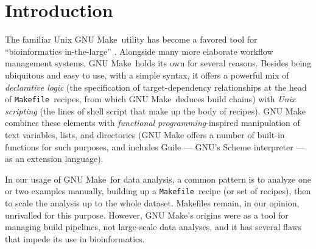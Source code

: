 \newcommand\Makefile{{\tt Makefile}}
\newcommand\make{GNU Make}
\newcommand\biomake{BioMake}
\newcommand\footurl[1]{\footnote{\url{#1}, accessed Dec 9, 2016.}}


\section*{Introduction}

The familiar Unix \make\ utility has become a favored tool for ``bioinformatics in-the-large'' \citep{ParkerGorlickLee2003}.
Alongside many more elaborate workflow management systems, \make\ holds its own for several reasons.
Besides being ubiquitous and easy to use, with a simple syntax, it offers a powerful mix
of {\em declarative logic} (the specification of target-dependency relationships at the head of \Makefile\ recipes, from which \make\ deduces build chains)
with {\em Unix scripting} (the lines of shell script that make up the body of recipes).
GNU Make combines these elements with {\em functional programming}-inspired manipulation of text variables, lists, and directories
(GNU Make offers a number of built-in functions for such purposes, and includes Guile --- GNU's Scheme interpreter --- as an extension language).

In our usage of \make\ for data analysis, a common pattern is to analyze one or two examples manually, building up a \Makefile\ recipe (or set of recipes),
then to scale the analysis up to the whole dataset.
Makefiles remain, in our opinion, unrivalled for this purpose.
However, GNU Make's origins were as a tool for managing build pipelines, not large-scale data analyses, and it has several flaws that impede its use in bioinformatics.

